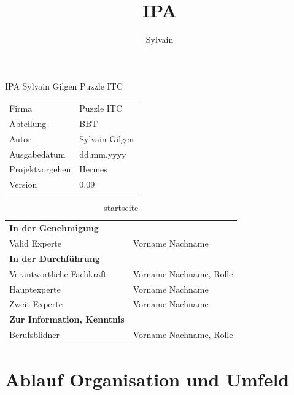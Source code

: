 \documentclass{report}
\author{Sylvain}
\title{IPA}
\begin{document}
\begin{titlepage}
  \Huge IPA Sylvain Gilgen Puzzle ITC\normalsize
\bigbreak
\begin{table}[h!]
    \begin{tabular}{|R{0.2\textwidth}|L{0.7\textwidth}|}
        \hline
          \\[12pt]
        \hline
        Firma & Puzzle ITC \\
        \hline
        Abteilung & BBT \\
        \hline
        Autor & Sylvain Gilgen \\
        \hline
        Ausgabedatum & dd.mm.yyyy \\
        \hline
        Projektvorgehen & Hermes \\
        \hline
        Version & 0.09 \\
        \hline
      \end{tabular}
\end{table}
\begin{table}[!h]
    \caption{startseite}
    \begin{tabular}{|L{0.4\textwidth}|L{0.5\textwidth}|}
        \hline
          \\[12pt]
        \hline
        \textbf{In der Genehmigung} & \\
        \hline
        Valid Experte & Vorname Nachname \\
        \hline
        \textbf{In der Durchführung} & \\
        \hline
        Verantwortliche Fachkraft & Vorname Nachname, Rolle \\
        \hline
        Hauptexperte & Vorname Nachname \\
        \hline
        Zweit Experte & Vorname Nachname \\
        \hline
        \textbf{Zur Information, Kenntnis} & \\
        \hline
        Berufsblidner & Vorname Nachname, Rolle \\
        \hline
    \end{tabular}
\end{table}
\end{titlepage}

\part{Ablauf Organisation und Umfeld}
\end{document}
